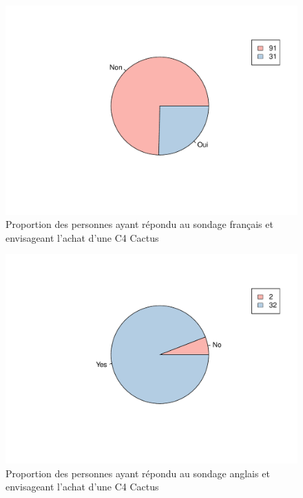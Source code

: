 \documentclass[12pt]{article}\usepackage[]{graphicx}\usepackage[]{color}
\makeatletter
\def\maxwidth{ %
  \ifdim\Gin@nat@width>\linewidth
    \linewidth
  \else
    \Gin@nat@width
  \fi
}
\newenvironment{knitrout}{}{} %
\makeatother
\begin{document}
\begin{knitrout}
\color{fgcolor}\begin{figure}[H]
\includegraphics[width=\maxwidth]{figure/buy_fr-1} \caption[Proportion des personnes ayant répondu au sondage français et envisageant l'achat d'une C4 Cactus]{Proportion des personnes ayant répondu au sondage français et envisageant l'achat d'une C4 Cactus}\label{fig:buy fr}
\end{figure}


\end{knitrout}

\begin{knitrout}
\color{fgcolor}\begin{figure}[H]
\includegraphics[width=\maxwidth]{figure/buy_en-1} \caption[Proportion des personnes ayant répondu au sondage anglais et envisageant l'achat d'une C4 Cactus]{Proportion des personnes ayant répondu au sondage anglais et envisageant l'achat d'une C4 Cactus}\label{fig:buy en}
\end{figure}


\end{knitrout}
\end{document}
